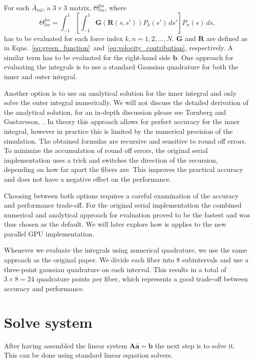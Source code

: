 For each $\bar{A}_{ml}$, a $3\times3$ matrix, $\Theta_{lm}^{kn}$, where
\begin{equation}
  \label{eq:inner_integral}
  \Theta_{lm}^{kn} = \int_{-1}^{1} \left[\int_{-1}^{1}\mathbf{G}(\mathbf{R}(s,s')) P_k(s') \, ds' \right]P_n(s) \, ds \text{,}
\end{equation}
has to be evaluated for each force index $k,n = 1,2,\dots,N$. $\mathbf{G}$ and $\mathbf{R}$ are defined as in Eqns.~\eqref{eq:green_function}~and~\eqref{eq:velocity_contribution}, respectively. A similar term has to be evaluated for the right-hand side $\mathbf{b}$. One approach for evaluating the integrals is to use a standard Gaussian quadrature for both the inner and outer integral. 

Another option is to use an analytical solution for the inner integral and only solve the outer integral numerically. We will not discuss the detailed derivation of the analytical solution, for an in-depth discussion please see Tornberg and Gustavsson,~\cite{Tornberg2006}. In theory this approach allows for perfect accuracy for the inner integral, however in practice this is limited by the numerical precision of the simulation. The obtained formulas are recursive and sensitive to round off errors. To minimize the accumulation of round off errors, the original serial implementation uses a trick and switches the direction of the recursion, depending on how far apart the fibers are. This improves the practical accuracy and does not have a negative effect on the performance.

Choosing between both options requires a careful examination of the accuracy and performance trade-off. For the original serial implementation the combined numerical and analytical approach for evaluation proved to be the fastest and was thus chosen as the default. We will later explore how is applies to the new parallel GPU implementation.

Whenever we evaluate the integrals using numerical quadrature, we use the same approach as the original paper. We divide each fiber into 8 subintervals and use a three-point gaussian quadrature on each interval. This results in a total of $3 \times 8 = 24$ quadrature points per fiber, which represents a good trade-off between accuracy and performance.

\section{Solve system}

After having assembled the linear system $\mathbf{A}\mathbf{\bar{a}}=\mathbf{b}$ the next step is to solve it. This can be done using standard linear equation solvers.


